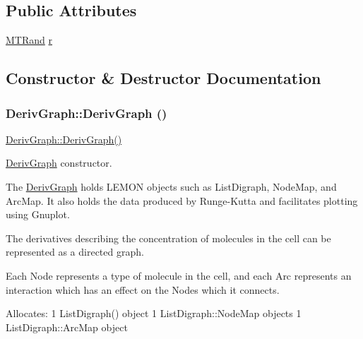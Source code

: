 \subsection*{Public Attributes}
\begin{DoxyCompactItemize}
\item 
\hyperlink{classMTRand}{MTRand} \hyperlink{classDerivGraph_a2d5931b4ca8a9c6e0c013a74a5cfbc7c}{r}
\end{DoxyCompactItemize}


\subsection{Constructor \& Destructor Documentation}
\hypertarget{classDerivGraph_af2a1f80b96b4657e7575748942d09947}{
\subsubsection[{DerivGraph}]{\setlength{\rightskip}{0pt plus 5cm}DerivGraph::DerivGraph ()}}
\label{classDerivGraph_af2a1f80b96b4657e7575748942d09947}
\hyperlink{classDerivGraph_af2a1f80b96b4657e7575748942d09947}{DerivGraph::DerivGraph()}

\hyperlink{classDerivGraph}{DerivGraph} constructor.

The \hyperlink{classDerivGraph}{DerivGraph} holds LEMON objects such as ListDigraph, NodeMap, and ArcMap. It also holds the data produced by Runge-\/Kutta and facilitates plotting using Gnuplot.

The derivatives describing the concentration of molecules in the cell can be represented as a directed graph.

Each Node represents a type of molecule in the cell, and each Arc represents an interaction which has an effect on the Nodes which it connects.

Allocates: 1 ListDigraph() object 1 ListDigraph::NodeMap objects 1 ListDigraph::ArcMap object 


